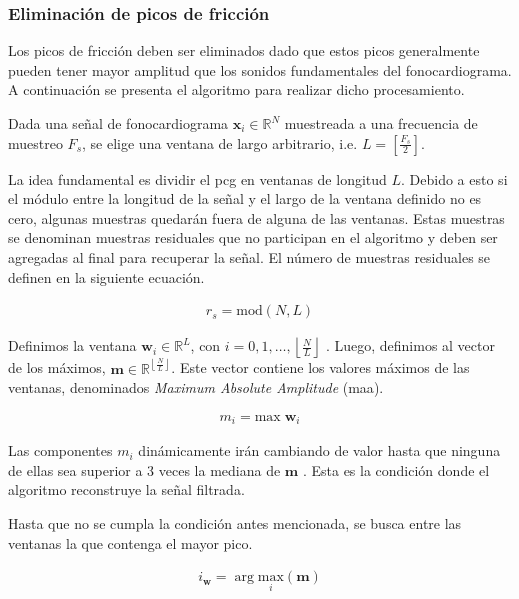 \pagebreak

\subsubsection*{Eliminación de picos de fricción}

\indent Los picos de fricción deben ser eliminados dado que estos picos generalmente pueden tener mayor amplitud que
los sonidos fundamentales del fonocardiograma. A continuación se presenta el algoritmo para realizar dicho
procesamiento. \bigskip

\indent Dada una señal de fonocardiograma $\bm{x}_i \in \mathbb{R}^N$ muestreada a una frecuencia de muestreo $F_s$,
se elige una ventana de largo arbitrario, i.e. $L = \left[\frac{F_s}{2}\right]$. \bigskip

\indent La idea fundamental es dividir el \acrshort{pcg} en ventanas de longitud $L$. Debido a esto si el módulo
entre la longitud de la señal y el largo de la ventana definido no es cero, algunas muestras quedarán fuera de
alguna de las ventanas. Estas muestras se denominan muestras residuales que no participan en el algoritmo y deben
ser agregadas al final para recuperar la señal. El número de muestras residuales se definen en la siguiente ecuación.

\begin{align}
  r_s = \mathrm{mod}(N,L)
\end{align}

\indent Definimos la ventana $\bm{w}_i \in \mathbb{R}^L$, con $i = 0,1,\dots,\left\lfloor \frac{N}{L} \right\rfloor$
. Luego, definimos al vector de los máximos, $\bm{m} \in \mathbb{R}^{\left\lfloor \frac{N}{L} \right\rfloor}$. Este
vector contiene los valores máximos de las ventanas, denominados \textit{Maximum Absolute Amplitude} (\acrshort{maa}).

\begin{align}
  m_i = \mathrm{max} \; \bm{w}_i
\end{align}

\indent Las componentes $m_i$ dinámicamente irán cambiando de valor hasta que ninguna de ellas sea superior a 3
veces la mediana de $\bm{m}$ \cite{pp:schmidt2010}.
Esta es la condición donde el algoritmo reconstruye la señal filtrada. \bigskip

\indent Hasta que no se cumpla la condición antes mencionada, se busca entre las ventanas la que contenga el mayor
pico.

\begin{align}
  i_{\bm{w}} = \arg \underset{i}{\mathrm{max}} (\bm{m})
\end{align}

